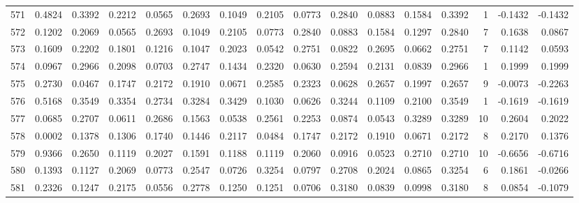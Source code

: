 \begin{tabular}{lrrrrrrrrrrrrrrr}
571 &      0.4824 &  0.3392 &  0.2212 &  0.0565 &  0.2693 &  0.1049 &  0.2105 &  0.0773 &  0.2840 &  0.0883 &   0.1584 &     0.3392 &      1 &                   -0.1432 &                    -0.1432 \\
572 &      0.1202 &  0.2069 &  0.0565 &  0.2693 &  0.1049 &  0.2105 &  0.0773 &  0.2840 &  0.0883 &  0.1584 &   0.1297 &     0.2840 &      7 &                    0.1638 &                     0.0867 \\
573 &      0.1609 &  0.2202 &  0.1801 &  0.1216 &  0.1047 &  0.2023 &  0.0542 &  0.2751 &  0.0822 &  0.2695 &   0.0662 &     0.2751 &      7 &                    0.1142 &                     0.0593 \\
574 &      0.0967 &  0.2966 &  0.2098 &  0.0703 &  0.2747 &  0.1434 &  0.2320 &  0.0630 &  0.2594 &  0.2131 &   0.0839 &     0.2966 &      1 &                    0.1999 &                     0.1999 \\
575 &      0.2730 &  0.0467 &  0.1747 &  0.2172 &  0.1910 &  0.0671 &  0.2585 &  0.2323 &  0.0628 &  0.2657 &   0.1997 &     0.2657 &      9 &                   -0.0073 &                    -0.2263 \\
576 &      0.5168 &  0.3549 &  0.3354 &  0.2734 &  0.3284 &  0.3429 &  0.1030 &  0.0626 &  0.3244 &  0.1109 &   0.2100 &     0.3549 &      1 &                   -0.1619 &                    -0.1619 \\
577 &      0.0685 &  0.2707 &  0.0611 &  0.2686 &  0.1563 &  0.0538 &  0.2561 &  0.2253 &  0.0874 &  0.0543 &   0.3289 &     0.3289 &     10 &                    0.2604 &                     0.2022 \\
578 &      0.0002 &  0.1378 &  0.1306 &  0.1740 &  0.1446 &  0.2117 &  0.0484 &  0.1747 &  0.2172 &  0.1910 &   0.0671 &     0.2172 &      8 &                    0.2170 &                     0.1376 \\
579 &      0.9366 &  0.2650 &  0.1119 &  0.2027 &  0.1591 &  0.1188 &  0.1119 &  0.2060 &  0.0916 &  0.0523 &   0.2710 &     0.2710 &     10 &                   -0.6656 &                    -0.6716 \\
580 &      0.1393 &  0.1127 &  0.2069 &  0.0773 &  0.2547 &  0.0726 &  0.3254 &  0.0797 &  0.2708 &  0.2024 &   0.0865 &     0.3254 &      6 &                    0.1861 &                    -0.0266 \\
581 &      0.2326 &  0.1247 &  0.2175 &  0.0556 &  0.2778 &  0.1250 &  0.1251 &  0.0706 &  0.3180 &  0.0839 &   0.0998 &     0.3180 &      8 &                    0.0854 &                    -0.1079 \\

\end{tabular}
